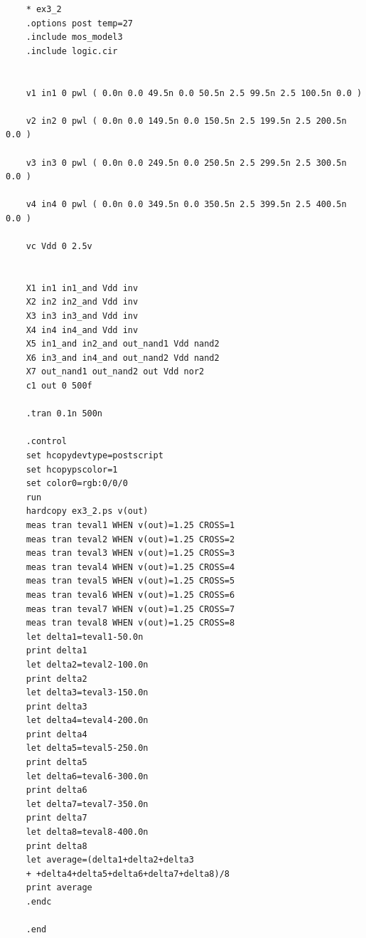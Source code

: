 \documentclass{jsarticle}
\begin{document}
\begin{lstlisting}
    * ex3_2
    .options post temp=27
    .include mos_model3
    .include logic.cir
    
    
    v1 in1 0 pwl ( 0.0n 0.0 49.5n 0.0 50.5n 2.5 99.5n 2.5 100.5n 0.0 )
    
    v2 in2 0 pwl ( 0.0n 0.0 149.5n 0.0 150.5n 2.5 199.5n 2.5 200.5n 0.0 )
    
    v3 in3 0 pwl ( 0.0n 0.0 249.5n 0.0 250.5n 2.5 299.5n 2.5 300.5n 0.0 )
    
    v4 in4 0 pwl ( 0.0n 0.0 349.5n 0.0 350.5n 2.5 399.5n 2.5 400.5n 0.0 )
    
    vc Vdd 0 2.5v
    
    
    X1 in1 in1_and Vdd inv
    X2 in2 in2_and Vdd inv
    X3 in3 in3_and Vdd inv
    X4 in4 in4_and Vdd inv
    X5 in1_and in2_and out_nand1 Vdd nand2
    X6 in3_and in4_and out_nand2 Vdd nand2
    X7 out_nand1 out_nand2 out Vdd nor2
    c1 out 0 500f
    
    .tran 0.1n 500n
    
    .control
    set hcopydevtype=postscript
    set hcopypscolor=1
    set color0=rgb:0/0/0
    run
    hardcopy ex3_2.ps v(out)
    meas tran teval1 WHEN v(out)=1.25 CROSS=1
    meas tran teval2 WHEN v(out)=1.25 CROSS=2
    meas tran teval3 WHEN v(out)=1.25 CROSS=3
    meas tran teval4 WHEN v(out)=1.25 CROSS=4
    meas tran teval5 WHEN v(out)=1.25 CROSS=5
    meas tran teval6 WHEN v(out)=1.25 CROSS=6
    meas tran teval7 WHEN v(out)=1.25 CROSS=7
    meas tran teval8 WHEN v(out)=1.25 CROSS=8
    let delta1=teval1-50.0n
    print delta1
    let delta2=teval2-100.0n
    print delta2
    let delta3=teval3-150.0n
    print delta3
    let delta4=teval4-200.0n
    print delta4
    let delta5=teval5-250.0n
    print delta5
    let delta6=teval6-300.0n
    print delta6
    let delta7=teval7-350.0n
    print delta7
    let delta8=teval8-400.0n
    print delta8
    let average=(delta1+delta2+delta3
    + +delta4+delta5+delta6+delta7+delta8)/8
    print average
    .endc
    
    .end
\end{lstlisting}
\end{document}
